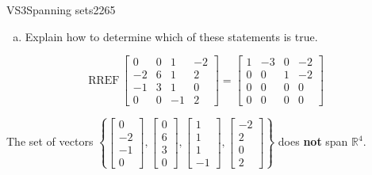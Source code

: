 \begin{exercise}{VS3}{Spanning sets}{2265}
\begin{exerciseStatement}
\begin{enumerate}[(a)]
\begin{itemize}
 
\end{itemize}

     
\item  

 Explain how to determine which of these statements is true. 

 
\end{enumerate}

     \end{exerciseStatement}
 \begin{exerciseAnswer} 

 \[
\mathrm{RREF}\, \left[\begin{array}{cccc}
0 & 0 & 1 & -2 \\
-2 & 6 & 1 & 2 \\
-1 & 3 & 1 & 0 \\
0 & 0 & -1 & 2
\end{array}\right] = \left[\begin{array}{cccc}
1 & -3 & 0 & -2 \\
0 & 0 & 1 & -2 \\
0 & 0 & 0 & 0 \\
0 & 0 & 0 & 0
\end{array}\right]
            \] 

 

 The set of vectors \(\left\{ \left[\begin{array}{c}
0 \\
-2 \\
-1 \\
0
\end{array}\right] , \left[\begin{array}{c}
0 \\
6 \\
3 \\
0
\end{array}\right] , \left[\begin{array}{c}
1 \\
1 \\
1 \\
-1
\end{array}\right] , \left[\begin{array}{c}
-2 \\
2 \\
0 \\
2
\end{array}\right] \right\}\) does \textbf{not} span \(\mathbb{R}^4\). 

 \end{exerciseAnswer}
 \end{exercise}


